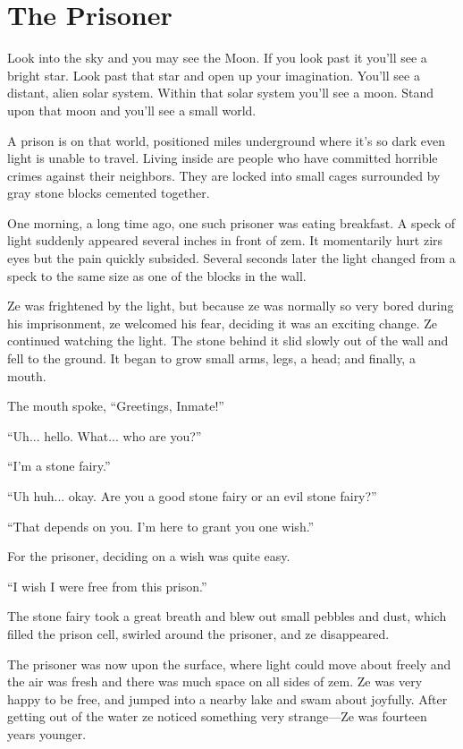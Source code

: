 \chapter{The Prisoner}

Look into the sky and you may see the Moon. If you look past it you'll see a bright star. Look past that star and open up your imagination. You'll see a distant, alien solar system. Within that solar system you'll see a moon. Stand upon that moon and you'll see a small world.

A prison is on that world, positioned miles underground where it's so dark even light is unable to travel. Living inside are people who have committed horrible crimes against their neighbors. They are locked into small cages surrounded by gray stone blocks cemented together.

One morning, a long time ago, one such prisoner was eating breakfast. A speck of light suddenly appeared several inches in front of zem. It momentarily hurt zirs eyes but the pain quickly subsided. Several seconds later the light changed from a speck to the same size as one of the blocks in the wall.

Ze was frightened by the light, but because ze was normally so very bored during his imprisonment, ze welcomed his fear, deciding it was an exciting change. Ze continued watching the light. The stone behind it slid slowly out of the wall and fell to the ground. It began to grow small arms, legs, a head; and finally, a mouth.

The mouth spoke, “Greetings, Inmate!”

“Uh... hello. What... who are you?”

“I'm a stone fairy.”

“Uh huh... okay. Are you a good stone fairy or an evil stone fairy?”

“That depends on you. I'm here to grant you one wish.”

For the prisoner, deciding on a wish was quite easy.

“I wish I were free from this prison.”

The stone fairy took a great breath and blew out small pebbles and dust, which filled the prison cell, swirled around the prisoner, and ze disappeared.

The prisoner was now upon the surface, where light could move about freely and the air was fresh and there was much space on all sides of zem. Ze was very happy to be free, and jumped into a nearby lake and swam about joyfully. After getting out of the water ze noticed something very strange—Ze was fourteen years younger.

